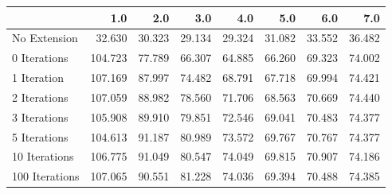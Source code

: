 \begin{tabular}{lrrrrrrr}
\toprule
{} &     1.0 &    2.0 &    3.0 &    4.0 &    5.0 &    6.0 &    7.0 \\
\midrule
No Extension   &  32.630 & 30.323 & 29.134 & 29.324 & 31.082 & 33.552 & 36.482 \\
0 Iterations   & 104.723 & 77.789 & 66.307 & 64.885 & 66.260 & 69.323 & 74.002 \\
1 Iteration    & 107.169 & 87.997 & 74.482 & 68.791 & 67.718 & 69.994 & 74.421 \\
2 Iterations   & 107.059 & 88.982 & 78.560 & 71.706 & 68.563 & 70.669 & 74.440 \\
3 Iterations   & 105.908 & 89.910 & 79.851 & 72.546 & 69.041 & 70.483 & 74.377 \\
5 Iterations   & 104.613 & 91.187 & 80.989 & 73.572 & 69.767 & 70.767 & 74.377 \\
10 Iterations  & 106.775 & 91.049 & 80.547 & 74.049 & 69.815 & 70.907 & 74.186 \\
100 Iterations & 107.065 & 90.551 & 81.228 & 74.036 & 69.394 & 70.488 & 74.385 \\
\bottomrule
\end{tabular}
